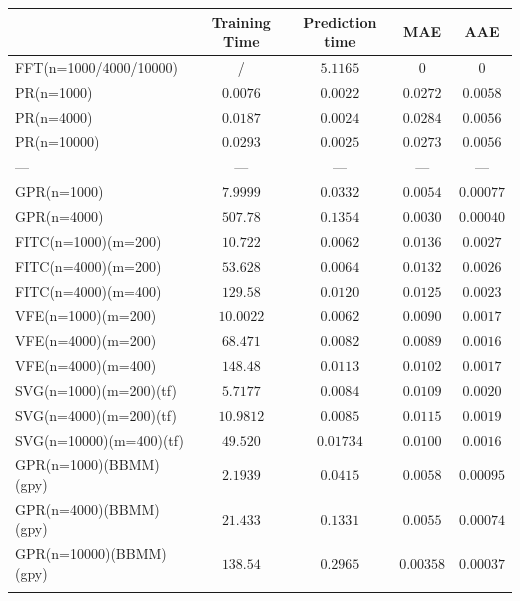 \documentclass[12pt,a4paper,oneside]{book}
\begin{document}
\begin{table}\centering 
\begin{tabular}[t]{lcccc}\toprule
            &   Training Time  &  Prediction time  &  MAE & AAE   \\ \midrule
FFT(n=1000/4000/10000)    &/ & $5.1165$ &  $0$  &  $0$    \\\addlinespace
PR(n=1000)   & $0.0076$ & $0.0022$    & $0.0272$ &  $0.0058$     \\\addlinespace
PR(n=4000)   &  $0.0187$  & $0.0024$ & $0.0284$ &  $0.0056$   \\\addlinespace
PR(n=10000)	  &   $0.0293$ & $0.0025$ & $0.0273$ & $0.0056$     \\\addlinespace
\qquad \qquad \qquad \qquad \qquad ---	  &   --- & --- & --- & ---     \\\addlinespace
GPR(n=1000)   &  $7.9999$  & $0.0332$ & $0.0054$ &  $0.00077$   \\\addlinespace
GPR(n=4000)   &  $507.78$  & $0.1354$  & $0.0030$ & $0.00040$    \\\addlinespace
FITC(n=1000)(m=200)  & $10.722$ & $0.0062$   & $0.0136$ &  $0.0027$     \\\addlinespace
FITC(n=4000)(m=200)   & $53.628$   & $0.0064$ & $0.0132$ &  $0.0026$   \\\addlinespace
FITC(n=4000)(m=400)	 & $129.58$   & $0.0120$ & $0.0125$ & $0.0023$    \\\addlinespace
VFE(n=1000)(m=200)  & $10.0022$ & $0.0062$   & $0.0090$ & $0.0017$  \\\addlinespace
VFE(n=4000)(m=200)   & $68.471$ &  $0.0082$   & $0.0089$ & $0.0016$     \\\addlinespace
VFE(n=4000)(m=400)	 & $148.48$ &  $0.0113$   & $0.0102$ & $0.0017$    \\\addlinespace
SVG(n=1000)(m=200)(tf)  & $5.7177$    & $0.0084$ &$0.0109$  &  $0.0020$   \\\addlinespace
SVG(n=4000)(m=200)(tf)  & $10.9812$   & $0.0085$ & $0.0115$ & $0.0019$    \\\addlinespace
SVG(n=10000)(m=400)(tf)	  & $49.520$   & $0.01734$  & $0.0100$ &  $0.0016$   \\\addlinespace
GPR(n=1000)(BBMM)(gpy)  & $2.1939 $  & $0.0415$ & $0.0058$ & $0.00095$    \\\addlinespace
GPR(n=4000)(BBMM)(gpy)  & $21.433$   & $0.1331$ & $0.0055$ & $0.00074$    \\\addlinespace
GPR(n=10000)(BBMM)(gpy)  & $138.54$   & $0.2965$  & $0.00358$ &     $0.00037$ \\\addlinespace

\end{tabular}
\end{table}
\end{document}
